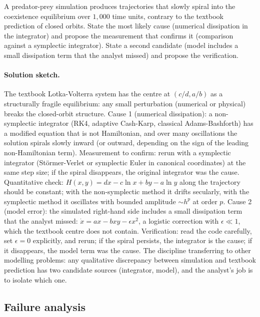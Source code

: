 \begin{exercise}
A predator-prey simulation produces trajectories that slowly
spiral into the coexistence equilibrium over $1{,}000$ time
units, contrary to the textbook prediction of closed orbits.
State the most likely cause (numerical dissipation in the
integrator) and propose the measurement that confirms it
(comparison against a symplectic integrator). State a second
candidate (model includes a small dissipation term that the
analyst missed) and propose the verification.

\paragraph{Solution sketch.} The textbook Lotka-Volterra system
has the centre at $(c/d, a/b)$ as a structurally fragile
equilibrium: any small perturbation (numerical or physical)
breaks the closed-orbit structure. Cause 1 (numerical
dissipation): a non-symplectic integrator (RK4, adaptive
Cash-Karp, classical Adams-Bashforth) has a modified equation
that is not Hamiltonian, and over many oscillations the
solution spirals slowly inward (or outward, depending on the
sign of the leading non-Hamiltonian term). Measurement to
confirm: rerun with a symplectic integrator (St\"ormer-Verlet
or symplectic Euler in canonical coordinates) at the same step
size; if the spiral disappears, the original integrator was the
cause. Quantitative check: $H(x, y) = d x - c \ln x + b y - a
\ln y$ along the trajectory should be constant; with the
non-symplectic method it drifts secularly, with the symplectic
method it oscillates with bounded amplitude $\sim h^{p}$ at
order $p$. Cause 2 (model error): the simulated right-hand side
includes a small dissipation term that the analyst missed:
$\dot{x} = a x - b x y - \epsilon x^{2}$, a logistic
correction with $\epsilon \ll 1$, which the textbook centre
does not contain. Verification: read the code carefully, set
$\epsilon = 0$ explicitly, and rerun; if the spiral persists,
the integrator is the cause; if it disappears, the model term
was the cause. The discipline transferring to other modelling
problems: any qualitative discrepancy between simulation and
textbook prediction has two candidate sources (integrator,
model), and the analyst's job is to isolate which one.
\end{exercise}

\subsection*{Failure analysis}


